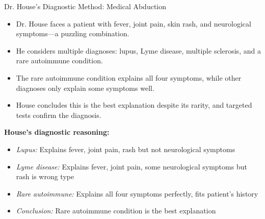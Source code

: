 \documentclass{beamer}
\begin{document}
\begin{frame}{Dr. House's Diagnostic Method: Medical Abduction}
	\begin{itemize}
		\item Dr. House faces a patient with fever, joint pain, skin rash, and neurological symptoms—a puzzling combination.
		\item He considers multiple diagnoses: lupus, Lyme disease, multiple sclerosis, and a rare autoimmune condition.
		\item The rare autoimmune condition explains all four symptoms, while other diagnoses only explain some symptoms well.
		\item House concludes this is the best explanation despite its rarity, and targeted tests confirm the diagnosis.
	\end{itemize}
	
	\begin{example}
		\scriptsize
		\textbf{House's diagnostic reasoning:}
		\begin{itemize}
			\item \textit{Lupus:} Explains fever, joint pain, rash but not neurological symptoms
			\item \textit{Lyme disease:} Explains fever, joint pain, some neurological symptoms but rash is wrong type
			\item \textit{Rare autoimmune:} Explains all four symptoms perfectly, fits patient's history
			\item \textit{Conclusion:} Rare autoimmune condition is the best explanation
		\end{itemize}
	\end{example}
\end{frame}
\end{document}
